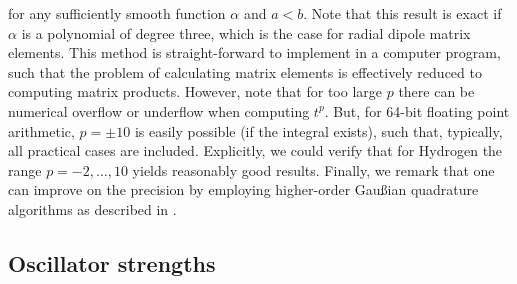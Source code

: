 \documentclass[fontsize=12pt,
               twoside=false,
               BCOR=0mm,
               DIV=14,
               overfullrule=true, %
               toc=bibliography,
               headinclude=true,
               footinclude=false]{scrartcl}
\numberwithin{equation}{section}
\begin{document}
    for any sufficiently smooth function $\alpha$ and $a<b$. Note that this
    result is exact if $\alpha$ is a polynomial of degree three, which is the
    case for radial dipole matrix elements. This method is straight-forward to
    implement in a computer program, such that the problem of calculating matrix
    elements is effectively reduced to computing matrix products. However, note
    that for too large $p$ there can be numerical overflow or underflow when
    computing $t^p$. But, for 64-bit floating point arithmetic, $p=\pm10$ is
    easily possible (if the integral exists), such that, typically, all
    practical cases are included. Explicitly, we could verify that for Hydrogen
    the range $p=-2,\dots,10$ yields reasonably good results. Finally, we remark
    that one can improve on the precision by employing higher-order Gau\ss{i}an
    quadrature algorithms as described in \cite{burden2011}.

    \subsection{Oscillator strengths}
    \label{subsec:OscillatorStrengths}
\end{document}

